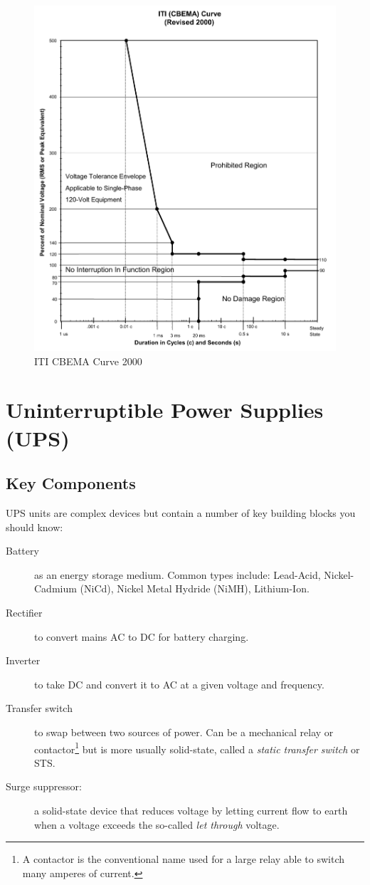 \documentclass{pgnotes}
\begin{document}
\begin{figure}[htbp]
  \centering
  \includegraphics[width=0.7\linewidth]{iti_cbema_curve}
  \caption{ITI CBEMA Curve 2000}
  \label{fig:itic-cbema-curve}
\end{figure}

\newpage

\section{Uninterruptible Power Supplies (UPS)}

\subsection{Key Components}
UPS units are complex devices but contain a number of key building blocks you should know: 
\begin{description}
\item[Battery] as an energy storage medium.
  Common types include: Lead-Acid, Nickel-Cadmium (NiCd), Nickel Metal Hydride (NiMH), Lithium-Ion. 
\item[Rectifier] to convert mains AC to DC for battery charging.
\item[Inverter] to take DC and convert it to AC at a given voltage and frequency.
\item[Transfer switch] to swap between two sources of power. Can be a mechanical relay or contactor\footnote{A contactor is the conventional name used for a large relay able to switch many amperes of current.} but is more usually solid-state, called a \textit{static transfer switch} or STS.
\item[Surge suppressor:] a solid-state device that reduces voltage by letting current flow to earth when a voltage exceeds the so-called \textit{let through} voltage.
\end{description}
\end{document}
